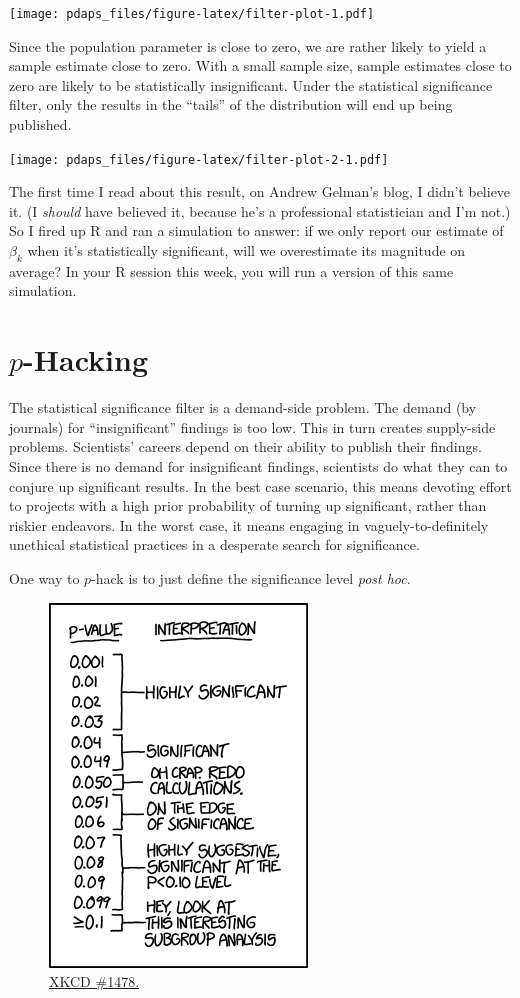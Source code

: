 \documentclass[12pt,oneside,openany]{book}
\begin{document}
\texttt{[image: pdaps\_files/figure-latex/filter-plot-1.pdf]}

Since the population parameter is close to zero, we are rather likely to
yield a sample estimate close to zero. With a small sample size, sample
estimates close to zero are likely to be statistically insignificant.
Under the statistical significance filter, only the results in the
``tails'' of the distribution will end up being published.

\texttt{[image: pdaps\_files/figure-latex/filter-plot-2-1.pdf]}

The first time I read about this result, on Andrew Gelman's blog, I
didn't believe it. (I \emph{should} have believed it, because he's a
professional statistician and I'm not.) So I fired up R and ran a
simulation to answer: if we only report our estimate of \(\beta_k\) when
it's statistically significant, will we overestimate its magnitude on
average? In your R session this week, you will run a version of this
same simulation.

\section{\texorpdfstring{\(p\)-Hacking}{p-Hacking}}\label{p-hacking}

The statistical significance filter is a demand-side problem. The demand
(by journals) for ``insignificant'' findings is too low. This in turn
creates supply-side problems. Scientists' careers depend on their
ability to publish their findings. Since there is no demand for
insignificant findings, scientists do what they can to conjure up
significant results. In the best case scenario, this means devoting
effort to projects with a high prior probability of turning up
significant, rather than riskier endeavors. In the worst case, it means
engaging in vaguely-to-definitely unethical statistical practices in a
desperate search for significance.

One way to \(p\)-hack is to just define the significance level
\emph{post hoc}.

\begin{figure}[htbp]
\centering
\includegraphics{p_values.png}
\caption{\href{https://xkcd.com/1478/}{XKCD \#1478.}}
\end{figure}
\end{document}
